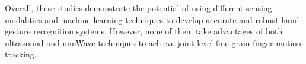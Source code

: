 \documentclass[11pt, oneside]{article}   	%
\begin{document}
Overall, these studies demonstrate the potential of using different sensing modalities and machine learning techniques to develop accurate and robust hand gesture recognition systems. However, none of them take advantages of both ultrasound and mmWave techniques to achieve joint-level fine-grain finger motion tracking.




\end{document}
